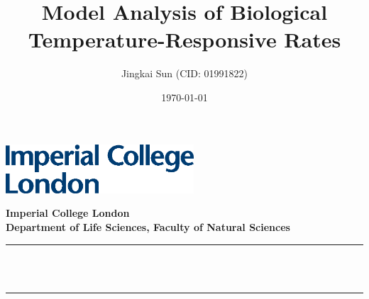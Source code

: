 \documentclass[11pt]{article}
\title{Model Analysis of Biological Temperature-Responsive Rates}
\author{Jingkai Sun (CID: 01991822)}
\date{\today}
\begin{document}
\begin{titlepage}

    \newcommand{\HRule}{\rule{\linewidth}{0.5mm}} %
    \newcommand{\wordcount}{} %
    
    
    \includegraphics[width=7cm]{../Results/Results_backup/images/logo.eps}\\[1cm] 
     
    
    \center %
    
    
    \textbf{\large Imperial College London}\\[0.8 cm] %
    \textbf{\large Department of Life Sciences, Faculty of Natural Sciences}\\[0.8 cm] %
    \makeatletter
    \HRule \\[0.6cm]
    { \huge \bfseries \@title}\\[0.6cm] %
    \HRule \\[1.5cm]


\end{titlepage}
\end{document}
